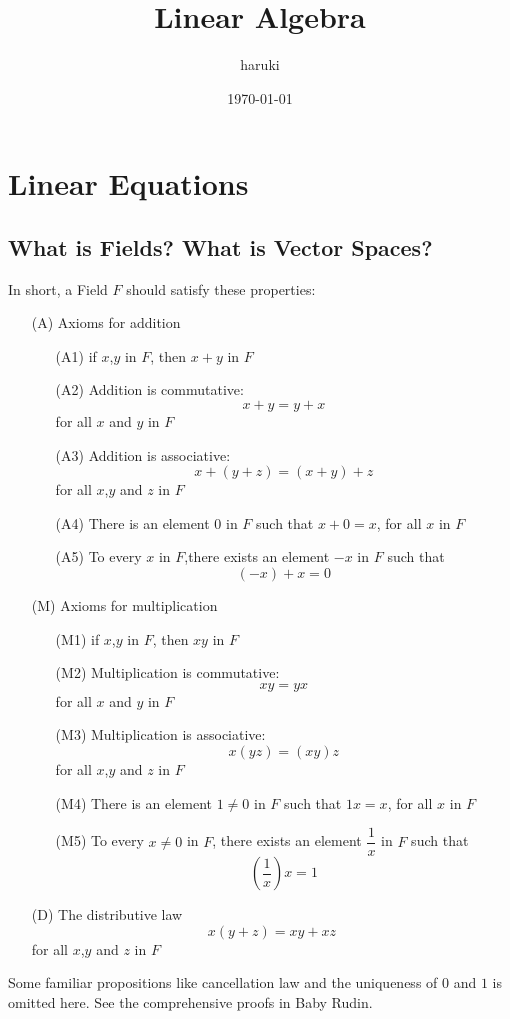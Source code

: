 \documentclass{article}
\title{Linear Algebra}
\author{haruki}
\date{\today}
\begin{document}
\maketitle
\tableofcontents
\thispagestyle{empty}
\newpage
\setcounter{page}{1}
\section{Linear Equations}\label{1}
\subsection{What is Fields? What is Vector Spaces?}
\noindent In short, a Field $F$ should satisfy these properties:
\begin{enumerate}
	\item[(A)] Axioms for addition
	\begin{enumerate}
		\item[(A1)] if $x$,$y$ in $F$, then $x+y$ in $F$
	    \item[(A2)] Addition is commutative:\[x+y=y+x\]for all $x$ and $y$ in $F$
	    \item[(A3)] Addition is associative:\[x+(y+z)=(x+y)+z\]for all $x$,$y$ and $z$ in $F$
	    \item[(A4)] There is an element $0$ in $F$ such that $x+0=x$, for all $x$ in $F$
	    \item[(A5)] To every $x$ in $F$,there exists an element $-x$ in $F$ such that \[(-x)+x=0\]
	\end{enumerate}
	\item[(M)] Axioms for multiplication
	\begin{enumerate}
		\item[(M1)] if $x$,$y$ in $F$, then $xy$ in $F$
		\item[(M2)] Multiplication is commutative:\[xy=yx\]for all $x$ and $y$ in $F$
		\item[(M3)] Multiplication is associative:\[x(yz)=(xy)z\]for all $x$,$y$ and $z$ in $F$
		\item[(M4)] There is an element $1\neq 0$ in $F$ such that $1x=x$, for all $x$ in $F$
		\item[(M5)] To every $x\neq 0$ in $F$, there exists an element $\dfrac{1}{x}$ in $F$ such that \[(\frac{1}{x})x=1\]
	\end{enumerate}
	\item[(D)] The distributive law\[x(y+z)=xy+xz\]for all $x$,$y$ and $z$ in $F$
\end{enumerate}
\indent Some familiar propositions like cancellation law and the uniqueness of $0$ and $1$ is omitted here. See the comprehensive proofs in Baby Rudin.\\
\end{document}
